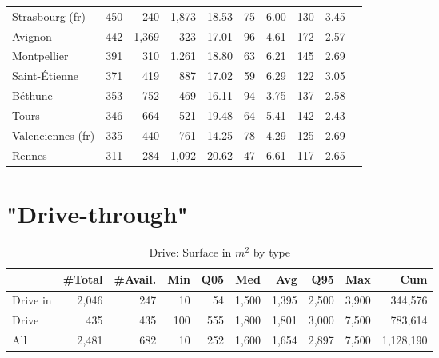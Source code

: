 \documentclass[11pt]{article}
\begin{document}
\begin{table}[H]
\begin{tabular}{llrrrrrrrr}
   Strasbourg (fr) &        450 &        240 &        1,873 &      18.53 &         75 &       6.00 &        130 &        3.45 \\
           Avignon &        442 &      1,369 &          323 &      17.01 &         96 &       4.61 &        172 &        2.57 \\
       Montpellier &        391 &        310 &        1,261 &      18.80 &         63 &       6.21 &        145 &        2.69 \\
     Saint-Étienne &        371 &        419 &          887 &      17.02 &         59 &       6.29 &        122 &        3.05 \\
           Béthune &        353 &        752 &          469 &      16.11 &         94 &       3.75 &        137 &        2.58 \\
             Tours &        346 &        664 &          521 &      19.48 &         64 &       5.41 &        142 &        2.43 \\
 Valenciennes (fr) &        335 &        440 &          761 &      14.25 &         78 &       4.29 &        125 &        2.69 \\
            Rennes &        311 &        284 &        1,092 &      20.62 &         47 &       6.61 &        117 &        2.65 \\
\bottomrule
\end{tabular}

\end{table}

\clearpage

\appendix

\section{"Drive-through"}

\begin{table}[H]
\caption{Drive: Surface in $m^2$ by type}
\small

\begin{tabular}{lrrrrrrrrr}
\toprule
{} &     \#Total &    \#Avail. &        Min &        Q05 &        Med &        Avg &        Q95 &        Max &        Cum \\
\midrule
Drive in &      2,046 &        247 &         10 &         54 &      1,500 &      1,395 &      2,500 &      3,900 &    344,576 \\
Drive    &        435 &        435 &        100 &        555 &      1,800 &      1,801 &      3,000 &      7,500 &    783,614 \\
All      &      2,481 &        682 &         10 &        252 &      1,600 &      1,654 &      2,897 &      7,500 &  1,128,190 \\
\bottomrule
\end{tabular}

\end{table}
\end{document}
